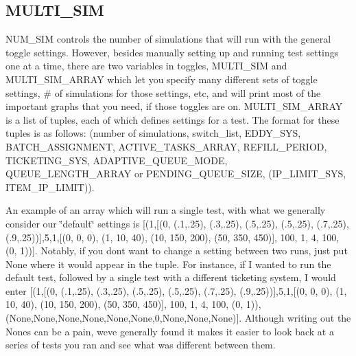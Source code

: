 \begin{DoxyVerb}
\begin{DoxyVerb}
\begin{DoxyItemize}
\end{DoxyItemize}\hypertarget{install_info_MULTI_SIM}{}\subsection{M\+U\+L\+T\+I\+\_\+\+S\+IM}\label{install_info_MULTI_SIM}
N\+U\+M\+\_\+\+S\+IM controls the number of simulations that will run with the general toggle settings. However, besides manually setting up and running test settings one at a time, there are two variables in toggles, M\+U\+L\+T\+I\+\_\+\+S\+IM and M\+U\+L\+T\+I\+\_\+\+S\+I\+M\+\_\+\+A\+R\+R\+AY which let you specify many different sets of toggle settings, \# of simulations for those settings, etc, and will print most of the important graphs that you need, if those toggles are on. M\+U\+L\+T\+I\+\_\+\+S\+I\+M\+\_\+\+A\+R\+R\+AY is a list of tuples, each of which defines settings for a test. The format for these tuples is as follows\+: (number of simulations, switch\+\_\+list, E\+D\+D\+Y\+\_\+\+S\+YS, B\+A\+T\+C\+H\+\_\+\+A\+S\+S\+I\+G\+N\+M\+E\+NT, A\+C\+T\+I\+V\+E\+\_\+\+T\+A\+S\+K\+S\+\_\+\+A\+R\+R\+AY, R\+E\+F\+I\+L\+L\+\_\+\+P\+E\+R\+I\+OD, T\+I\+C\+K\+E\+T\+I\+N\+G\+\_\+\+S\+YS, A\+D\+A\+P\+T\+I\+V\+E\+\_\+\+Q\+U\+E\+U\+E\+\_\+\+M\+O\+DE, Q\+U\+E\+U\+E\+\_\+\+L\+E\+N\+G\+T\+H\+\_\+\+A\+R\+R\+AY or P\+E\+N\+D\+I\+N\+G\+\_\+\+Q\+U\+E\+U\+E\+\_\+\+S\+I\+ZE, (I\+P\+\_\+\+L\+I\+M\+I\+T\+\_\+\+S\+YS, I\+T\+E\+M\+\_\+\+I\+P\+\_\+\+L\+I\+M\+IT)).

An example of an array which will run a single test, with what we generally consider our \char`\"{}default\char`\"{} settings is \mbox{[}(1,\mbox{[}(0, (.1,.25), (.3,.25), (.5,.25), (.5,.25), (.7,.25), (.9,.25))\mbox{]},5,1,\mbox{[}(0, 0, 0), (1, 10, 40), (10, 150, 200), (50, 350, 450)\mbox{]}, 100, 1, 4, 100, (0, 1))\mbox{]}. Notably, if you don\textquotesingle{}t want to change a setting between two runs, just put None where it would appear in the tuple. For instance, if I wanted to run the default test, followed by a single test with a different ticketing system, I would enter \mbox{[}(1,\mbox{[}(0, (.1,.25), (.3,.25), (.5,.25), (.5,.25), (.7,.25), (.9,.25))\mbox{]},5,1,\mbox{[}(0, 0, 0), (1, 10, 40), (10, 150, 200), (50, 350, 450)\mbox{]}, 100, 1, 4, 100, (0, 1)),(None,None,None,None,None,None,0,None,None,None)\mbox{]}. Although writing out the Nones can be a pain, we\textquotesingle{}ve generally found it makes it easier to look back at a series of tests you ran and see what was different between them.


\end{DoxyVerb}
\end{DoxyVerb}
